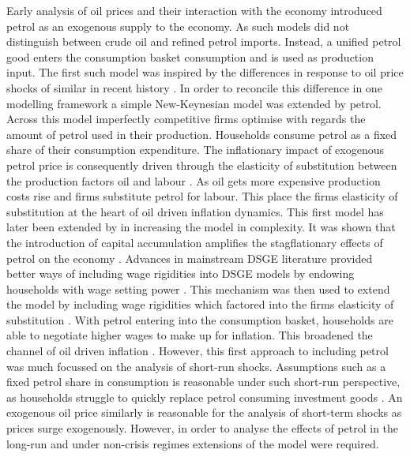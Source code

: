 \documentclass[12pt,a4paper,english]{article} %
\begin{document}
	Early analysis of oil prices and their interaction with the economy introduced petrol as an exogenous supply to the economy. As such models did not distinguish between crude oil and refined petrol imports. Instead, a unified petrol good enters the consumption basket consumption and is used as production input. The first such model was inspired by the differences in response to oil price shocks of similar in recent history \cite{macroeconomic_2007}. In order to reconcile this difference in one modelling framework a simple New-Keynesian model was extended by petrol. Across this model imperfectly competitive firms optimise with regards the amount of petrol used in their production. Households consume petrol as a fixed share of their consumption expenditure. The inflationary impact of exogenous petrol price is consequently driven through the elasticity of substitution between the production factors oil and labour \cite{blanchard_macroeconomic_2007}. As oil gets more expensive production costs rise and firms substitute petrol for labour. This place the firms elasticity of substitution at the heart of oil driven inflation dynamics. This first model has later been extended by in increasing the model in complexity. It was shown that the introduction of capital accumulation amplifies the stagflationary effects of petrol on the economy \cite{vasconez_what_nodate}. Advances in mainstream DSGE literature provided better ways of including wage rigidities into DSGE models by endowing households with wage setting power \cite{smets_shocks_2007}. This mechanism was then used to extend the model by including wage rigidities which factored into the firms elasticity of substitution \cite{leduc_quantitative_2004}. With petrol entering into the consumption basket, households are able to negotiate higher wages to make up for inflation. This broadened the channel of oil driven inflation \cite{leduc_quantitative_2004}.	However, this first approach to including petrol was much focussed on the analysis of short-run shocks. Assumptions such as a fixed petrol share in consumption is reasonable under such short-run perspective, as households struggle to quickly replace petrol consuming investment goods \cite{blanchard_macroeconomic_2007}. An exogenous oil price similarly is reasonable for the analysis of short-term shocks as prices surge exogenously. However, in order to analyse the effects of petrol in the long-run and under non-crisis regimes extensions of the model were required.
	
\end{document}
